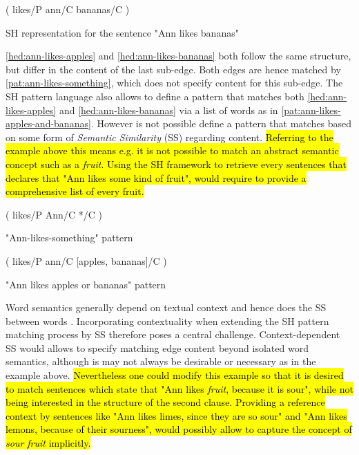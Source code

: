 \documentclass[11pt]{scrreprt}
\let\cite\parencite  %
\begin{document}
\begin{hedge}
  \normalfont\sffamily
  \centering
  ( likes/P ann/C bananas/C ) 
  \caption{SH representation for the sentence "Ann likes bananas"}
  \label{hed:ann-likes-bananas}
\end{hedge}


\cref{hed:ann-likes-apples} and \cref{hed:ann-likes-bananas} both follow the same structure, but differ in the content of the last sub-edge. Both edges are hence matched by \cref{pat:ann-likes-something}, which does not specify content for this sub-edge.
The SH pattern language also allows to define a pattern that matches both \cref{hed:ann-likes-apples} and \cref{hed:ann-likes-bananas} via a list of words as in \cref{pat:ann-likes-apples-and-bananas}. However is not possible define a pattern that matches based on some form of \textit{Semantic Similarity} (SS) \cite{harispeSemanticSimilarityNatural2015} regarding content. \hl{Referring to the example above this means e.g. it is not possible to match an abstract semantic concept such as a \textit{fruit}. Using the SH framework to retrieve every sentences that declares that "Ann likes some kind of fruit", would require to provide a comprehensive list of every fruit.} 

\begin{pattern}[h!]
  \normalfont\sffamily
  \centering
  ( likes/P Ann/C */C )
  \caption{"Ann-likes-something" pattern}
  \label{pat:ann-likes-something}
\end{pattern}

\begin{pattern}[h!]
  \normalfont\sffamily
  \centering
  ( likes/P ann/C [apples, bananas]/C )
  \caption{"Ann likes apples or bananas" pattern}
  \label{pat:ann-likes-apples-and-bananas}
\end{pattern}



Word semantics generally depend on textual context and hence does the SS between words \cite[Section~2.2.3]{harispeSemanticSimilarityNatural2015}. Incorporating contextuality when extending the SH pattern matching process by SS therefore poses a central challenge. Context-dependent SS would allows to specify matching edge content beyond isolated word semantics, although is may not always be desirable or necessary as in the example above. \hl{Nevertheless one could modify this example so that it is desired to match sentences which state that "Ann likes \textit{fruit}, because it is sour", while not being interested in the structure of the second clause. Providing a reference context by sentences like "Ann likes limes, since they are so sour" and "Ann likes lemons, because of their sourness", would possibly allow to capture the concept of \textit{sour fruit} implicitly.} 
\end{document}
